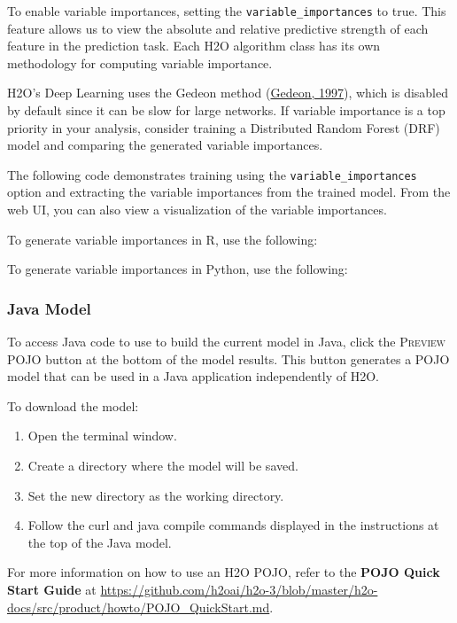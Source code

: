 {{To enable variable importances, setting the \texttt{variable\_importances} to true. This feature allows us to view the absolute and relative predictive strength of each feature in the prediction task.  Each H2O algorithm class has its own methodology for computing variable importance.  

H2O's Deep Learning uses the Gedeon method (\href{http://cs.anu.edu.au/people/Tom.Gedeon/pdfs/ContribDataMinv2.pdf}{Gedeon, 1997}), which is disabled by default since it can be slow for large networks.  If variable importance is a top priority in your analysis, consider training a Distributed Random Forest (DRF) model and comparing the generated variable importances.

The following code demonstrates training using the \texttt{variable\_importances} option and extracting the variable importances from the trained model.  From the web UI, you can also view a visualization of the variable importances.

\waterExampleInR
To generate variable importances in R, use the following: 


\newpage
\waterExampleInPython
To generate variable importances in Python, use the following: 


\subsubsection{Java Model} 

To access Java code to use to build the current model in Java, click the \textsc{Preview POJO} button at the
bottom of the model results. This button generates a POJO model that can be used in a Java application independently of H2O. 

To download the model:
\begin{enumerate}
\item Open the terminal window.
\item Create a directory where the model will be saved.
\item Set the new directory as the working directory.
\item Follow the curl and java compile commands displayed in the instructions at the top of the Java model.
\end{enumerate}

For more information on how to use an H2O POJO, refer to the \textbf{POJO Quick Start Guide} at {\url{https://github.com/h2oai/h2o-3/blob/master/h2o-docs/src/product/howto/POJO_QuickStart.md}}. 

}}
